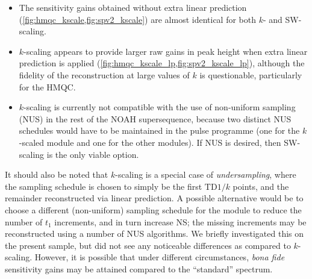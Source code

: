 \begin{itemize}
    \item The sensitivity gains obtained without extra linear prediction (\cref{fig:hmqc_kscale,fig:spv2_kscale}) are almost identical for both $k$- and SW-scaling.
    \item $k$-scaling appears to provide larger raw gains in peak height when extra linear prediction is applied (\cref{fig:hmqc_kscale_lp,fig:spv2_kscale_lp}), although the fidelity of the reconstruction at large values of $k$ is questionable, particularly for the HMQC.
    \item $k$-scaling is currently not compatible with the use of non-uniform sampling (NUS) in the rest of the NOAH supersequence, because two distinct NUS schedules would have to be maintained in the pulse programme (one for the $k$-scaled module and one for the other modules).
        If NUS is desired, then SW-scaling is the only viable option.
\end{itemize}

It should also be noted that $k$-scaling is a special case of \textit{undersampling}, where the sampling schedule is chosen to simply be the first $\mathrm{TD1}/k$ points, and the remainder reconstructed via linear prediction.
A possible alternative would be to choose a different (non-uniform) sampling schedule for the \nitrogen{} module to reduce the number of $t_1$ increments, and in turn increase NS; the missing increments may be reconstructed using a number of NUS algorithms.
We briefly investigated this on the present sample, but did not see any noticeable differences as compared to $k$-scaling.
However, it is possible that under different circumstances, \textit{bona fide} sensitivity gains may be attained compared to the ``standard'' spectrum.\autocite{Mobli2014PNMRS,Palmer2015JPCB}


